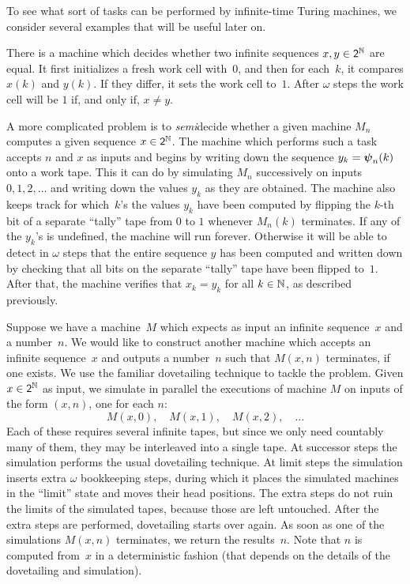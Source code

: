 To see what sort of tasks can be performed by infinite-time Turing machines, we consider
several examples that will be useful later on.

\begin{example}
  There is a machine which decides whether two infinite sequences $x, y \in
  \mathsf{2}^{\mathbb{N}}$ are equal. It first initializes a fresh work cell with~$0$, and then
  for each~$k$, it compares $x(k)$ and $y(k)$. If they differ, it sets the work cell to~$1$. After $\omega$ steps the work cell will be $1$ if, and only if, $x \neq y$.
\end{example}

\begin{example}
  A more complicated problem is to \emph{semi}decide whether a given machine $M_n$ computes
  a given sequence $x \in \mathsf{2}^{\mathbb{N}}$. The machine which performs such a task accepts $n$ and $x$ as inputs and begins by writing down the sequence $y_k = \text{\boldmath{$\psi$}}_{n}(k)$ onto a work tape. This it can do by simulating $M_n$ successively on inputs $0, 1, 2, \ldots$ and writing down the values $y_k$ as they are obtained. The machine also keeps track for which~$k$'s the values $y_k$ have been computed by flipping the $k$-th bit of a separate ``tally'' tape from $0$ to $1$ whenever $M_n(k)$ terminates. If any of the $y_k$'s is undefined, the machine will run forever. Otherwise it will be able to detect in $\omega$ steps that the entire sequence $y$ has been computed and written down by checking that all bits on the separate ``tally'' tape have been flipped to~$1$. After that, the machine verifies that $x_k = y_k$ for all $k \in \mathbb{N}$, as described previously.
\end{example}

\begin{example}
  Suppose we have a machine~$M$ which expects as input an infinite sequence~$x$ and a
  number~$n$. We would like to construct another machine which accepts an infinite
  sequence~$x$ and outputs a number~$n$ such that $M(x,n)$ terminates, if one exists.
  We use the familiar dovetailing technique to tackle the problem. Given $x \in \mathsf{2}^{\mathbb{N}}$ as input, we simulate in parallel the executions of machine $M$ on inputs of the form $(x,n)$, one
  for each $n$:
  \begin{equation*}
    M(x,0), \quad
    M(x,1), \quad
    M(x,2), \quad
    \ldots
  \end{equation*}
  Each of these requires several infinite tapes, but since we only need countably
  many of them, they may be interleaved into a single tape. At successor steps the
  simulation performs the usual dovetailing technique. At limit steps the
  simulation inserts extra $\omega$ bookkeeping steps, during which it places the
  simulated machines in the ``limit'' state and moves their head positions. The
  extra steps do not ruin the limits of the simulated tapes, because those are
  left untouched. After the extra steps are performed, dovetailing starts over
  again. As soon as one of the simulations $M(x, n)$ terminates, we return the
  results~$n$. Note that $n$ is computed from~$x$ in a deterministic fashion (that depends on the details of the dovetailing and simulation).
\end{example}

